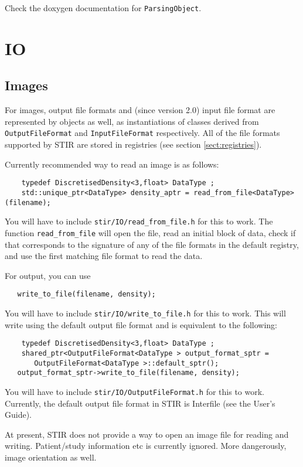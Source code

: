 \documentclass{article}
\begin{document}
Check the doxygen documentation for
\texttt{ParsingObject}.

\section{
IO \label{sect:IO}}

\subsection{Images}
For images, output file formats and (since version 2.0) input file format are represented 
by objects as well, as instantiations of classes derived from 
\texttt{OutputFileFormat} and \texttt{InputFileFormat} respectively. All of
the file formats supported by STIR are stored in registries (see section \ref{sect:registries}).

Currently recommended way to read an image is as follows:
\begin{verbatim}
    typedef DiscretisedDensity<3,float> DataType ;
    std::unique_ptr<DataType> density_aptr = read_from_file<DataType>(filename);
\end{verbatim}
You will have to include \texttt{stir/IO/read\_from\_file.h} for this to work. The function
\texttt{read\_from\_file} will open the file, read an initial block of data, check
if that corresponds to the signature of any of the file formats in the
default registry, and use the first matching file format to read the data.

For output, you can use
\begin{verbatim}
   write_to_file(filename, density);
\end{verbatim}
You will have to include \texttt{stir/IO/write\_to\_file.h} for this to work. This
will write using the default output file format and is equivalent to the following:
\begin{verbatim}
    typedef DiscretisedDensity<3,float> DataType ;
    shared_ptr<OutputFileFormat<DataType > output_format_sptr =
       OutputFileFormat<DataType >::default_sptr();
   output_format_sptr->write_to_file(filename, density);
\end{verbatim}
You will have to include \texttt{stir/IO/OutputFileFormat.h} for this to work.
Currently, the default output file format in STIR is Interfile (see the User's Guide).

At present, STIR does not provide a way to open an image file for reading and writing.
Patient/study information etc is currently ignored. More dangerously, image orientation
as well.
\end{document}
